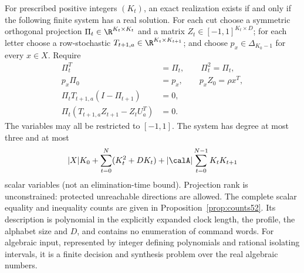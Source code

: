 \begin{theorem}\label{thm:local51}
For prescribed positive integers $(K_t)$, an exact realization exists
if and only if the following finite system has a real solution.
For each cut choose a symmetric orthogonal projection
$\Pi_t\in\R^{K_t\times K_t}$ and a matrix
$Z_t\in[-1,1]^{K_t\times D}$; for each letter choose a row-stochastic
$T_{t+1,a}\in\R^{K_t\times K_{t+1}}$; and choose
$p_x\in\Delta_{K_0-1}$ for every $x\in X$. Require
\begin{align}
 \Pi_t^T&=\Pi_t,\qquad \Pi_t^2=\Pi_t,\label{eq:projector51}\\
 p_x\Pi_0&=p_x,\qquad p_xZ_0=\rho x^T,\label{eq:seed51}\\
 \Pi_tT_{t+1,a}(I-\Pi_{t+1})&=0,\label{eq:invariant51}\\
 \Pi_t(T_{t+1,a}Z_{t+1}-Z_tU_a^T)&=0.\label{eq:intertwine51}
\end{align}
The variables may all be restricted to $[-1,1]$. The system has degree
at most three and at most
\begin{equation}\label{eq:variables51}
 |X|K_0+\sum_{t=0}^N(K_t^2+DK_t)
       +|\calA|\sum_{t=0}^{N-1}K_tK_{t+1}
\end{equation}
scalar variables (not an elimination-time bound). Projection rank is
unconstrained: protected unreachable directions are allowed. The complete
scalar equality and inequality counts are given in
Proposition~\ref{prop:counts52}. Its description is polynomial in the explicitly
expanded clock length, the profile, the alphabet size and $D$, and
contains no enumeration of command words. For algebraic input, represented by integer defining polynomials and
rational isolating intervals, it is a finite decision and synthesis
problem over the real algebraic numbers.
\end{theorem}
